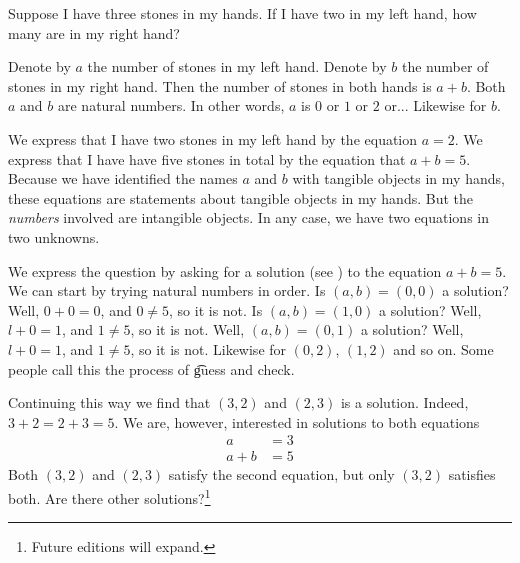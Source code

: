 

Suppose I have three stones in my hands.
If I have two in my left hand, how many are in my right hand?


Denote by $a$ the number of stones in my left hand.
Denote by $b$ the number of stones in my right hand.
Then the number of stones in both hands is $a + b$.
Both $a$ and $b$ are natural numbers.
In other words, $a$ is $0$ or $1$ or $2$ or...
Likewise for $b$.

We express that I have two stones in my left hand by the equation $a = 2$.
We express that I have have five stones in total by the equation that $a + b = 5$.
Because we have identified the names $a$ and $b$ with tangible objects in my hands, these equations are statements about tangible objects in my hands.
But the \textit{numbers} involved are intangible objects.
In any case, we have two equations in two unknowns.

We express the question  by asking for a solution (see ) to the equation $a + b = 5$.
We can start by trying natural numbers in order.
Is $(a, b) = (0, 0)$ a solution?
Well, $0 + 0 = 0$, and $0 \neq 5$, so it is not.
Is $(a, b) = (1, 0)$ a solution?
Well, $l + 0 = 1$, and $1 \neq 5$, so it is not.
Well, $(a, b) = (0, 1)$ a solution?
Well, $l + 0 = 1$, and $1 \neq 5$, so it is not.
Likewise for $(0, 2)$, $(1, 2)$ and so on.
Some people call this the process of \t{guess and check}.

Continuing this way we find that $(3, 2)$ and $(2, 3)$ is a solution.
Indeed, $3 + 2 = 2 + 3 = 5$.
We are, however, interested in solutions to both equations
\[
  \begin{aligned}
  a &= 3 \\
  a + b &= 5
  \end{aligned}
\]
Both $(3, 2)$ and $(2, 3)$ satisfy the second equation, but only $(3, 2)$ satisfies both.
Are there other solutions?\footnote{Future editions will expand.}
